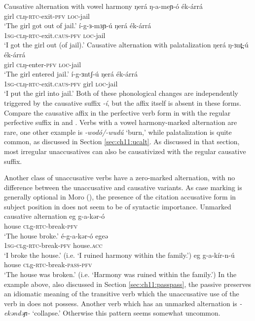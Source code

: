 \ea Causative alternation with vowel harmony \label{ex:ch12:vharmcaus}
\ea \gll  ŋerá ŋ-a-meɲ-ó ék-árrá\\
girl \textsc{cl}ŋ-\textsc{rtc}-exit-\textsc{pfv} \textsc{loc}-jail\\
\glt ‘The girl got out of jail.’ 
\ex \gll í-g-ɜ-mɜɲ-ú ŋerá ék-árrá\\
\textsc{1sg-cl}ŋ-\textsc{rtc}-exit.\textsc{caus}-\textsc{pfv} \textsc{loc}-jail\\
\glt 	‘I got the girl out (of jail).’   \label{ex:ch12:vharmcausb}
\z 
\ex Causative alternation with palatalization \label{ex:ch12:palatalcaus}
 \ea \gll  ŋerá ŋ-ɜnt̪-ú ék-árrá\\
girl \textsc{cl}ŋ-enter-\textsc{pfv} \textsc{loc}-jail\\
\glt ‘The girl entered jail.’ 
\ex \gll í-g-ɜntʃ-ú ŋerá ék-árrá\\
\textsc{1sg-cl}ŋ-\textsc{rtc}-exit.\textsc{caus}-\textsc{pfv} girl \textsc{loc}-jail\\
\glt 	‘I put the girl into jail.’   \label{ex:ch12:palatalcausb}
\z  
\z 
Both of these phonological changes are independently triggered by the causative suffix \textit{-í}, but the affix itself is absent in these forms. Compare the causative affix in the perfective verb form in  with the regular perfective suffix in  and . Verbs with a vowel harmony-marked alternation are rare, one other example is \textit{-wodó/-wudú} `burn,' while palatalization is quite common, as discussed in Section \ref{sec:ch11:ucalt}. As discussed in that section, most irregular unaccusatives can also be causativized with the regular causative suffix.

Another class of unaccusative verbs have a zero-marked alternation, with no difference between the unaccusative and causative variants. As case marking is generally optional in Moro (), the presence of the citation accusative form in subject position in  does not seem to be of syntactic importance.
\ea Unmarked causative alternation \label{ex:ch12:unmarkedcaus}
\ea \gll eg g-a-kər-ó  \\
house \textsc{cl}g-\textsc{rtc}-break-\textsc{pfv} \\
\glt ‘The house broke.’ \label{ex:ch12:unmarkedcausa}
\ex \gll é-g-a-kər-ó egeə \\
\textsc{1sg-cl}g-\textsc{rtc}-break-\textsc{pfv} house.\textsc{acc}\\
\glt ‘I broke the house.’ (i.e. `I ruined harmony within the family.')
\ex  \gll eg g-a-kír-n-ú\\
house \textsc{cl}g-\textsc{rtc}-break-\textsc{pass-pfv} \\
\glt ‘The house was broken.’ (i.e. `Harmony was ruined within the family.')
\z 
\z 
In the example above, also discussed in Section \ref{sec:ch11:passpass}, the passive preserves an idiomatic meaning of the transitive verb which the unaccusative use of the verb in  does not possess. Another verb which has an unmarked alternation is \textit{-ekəndəɲ-} `collapse.' Otherwise this pattern seems somewhat uncommon. 

